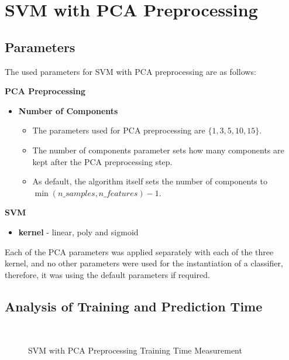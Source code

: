\documentclass{article}[12pt]
\theoremstyle{mydef}
\begin{document}
    \section{SVM with PCA Preprocessing}
    \label{sec:svm-pca}


        \subsection*{Parameters}
        The used parameters for SVM with PCA preprocessing are as follows: 

        \textbf{PCA Preprocessing}
        \begin{itemize}
            \item \textbf{Number of Components} 
            \begin{itemize}
                \item The parameters used for PCA preprocessing are $\{1, 3, 5, 10, 15\}$.
                \item The number of components parameter sets how many components are kept after the PCA preprocessing step.
                \item As default, the algorithm itself sets the number of components to $\min(n\_samples, n\_features) - 1$.
            \end{itemize}
        \end{itemize}

        \textbf{SVM}
        \begin{itemize}
            \item \textbf{kernel} - linear, poly and sigmoid
        \end{itemize}
        
        
        Each of the PCA parameters was applied separately with each of the three kernel, and no other parameters were used for the instantiation of a classifier, 
        therefore, it was using the default parameters if required.
        
        \subsection{Analysis of Training and Prediction Time}

            \begin{figure}[!h]
                \centering
                \quad
                \\
                \quad
                \caption{SVM with PCA Preprocessing Training Time Measurement}
                \label{fig:pca-train-graphs}
            \end{figure}
\end{document}
